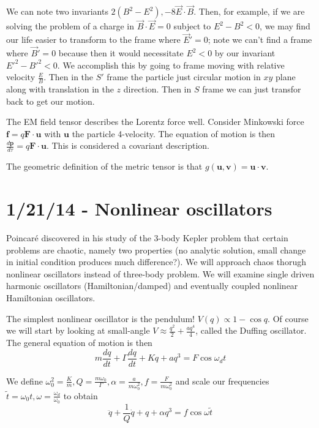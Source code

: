 \documentclass[10pt]{report}
\newcommand{\rd}[2]{\frac{d#1}{d#2}}
\begin{document}
We can note two invariants $2(B^2 - E^2), -8\vec{E}\cdot \vec{B}$. Then, for example, if we are solving the problem of a charge in $\vec{B}\cdot \vec{E} = 0$ subject to $E^2 - B^2 < 0$, we may find our life easier to transform to the frame where $\vec{E}' = 0$; note we can't find a frame where $\vec{B}' = 0$ because then it would necessitate $E^2 < 0$ by our invariant $E'^2 - B'^2 < 0$. We accomplish this by going to frame moving with relative velocity $\frac{E}{B}$. Then in the $S'$ frame the particle just circular motion in $xy$ plane along with translation in the $z$ direction. Then in $S$ frame we can just transfor back to get our motion. 

The EM field tensor describes the Lorentz force well. Consider Minkowski force $\mathbf{f} = q\mathbf{F}\cdot \mathbf{u}$ with $\mathbf{u}$ the particle 4-velocity. The equation of motion is then $\rd{\mathbf{p}}{\tau} = q\mathbf{F}\cdot \mathbf{u}$. This is considered a covariant description. 

The geometric definition of the metric tensor is that $g(\mathbf{u}, \mathbf{v}) = \mathbf{u}\cdot \mathbf{v}$.

\chapter{1/21/14 - Nonlinear oscillators}

Poincar\'e discovered in his study of the 3-body Kepler problem that certain problems are chaotic, namely two properties (no analytic solution, small change in initial condition produces much difference?). We will approach chaos thorugh nonlinear oscillators instead of three-body problem. We will examine single driven harmonic oscillators (Hamiltonian/damped) and eventually coupled nonlinear Hamiltonian oscillators.

The simplest nonlinear oscillator is the pendulum! $V(q) \propto 1-\cos q$. Of course we will start by looking at small-angle $V \approx \frac{q^2}{2} + \frac{aq^4}{4}$, called the Duffing oscillator. The general equation of motion is then
\begin{equation}
    m\rd{q}{t} + \Gamma\rd{q}{t} + Kq + aq^3 = F\cos \omega_d t
    \label{1.21.duffingComplex}
\end{equation}

We define $\omega_0^2 = \frac{K}{m}, Q = \frac{m\omega_0}{\Gamma}, \alpha = \frac{a}{m\omega_0^2}, f = \frac{F}{m\omega_0^2}$ and scale our frequencies $\tilde{t} = \omega_0 t, \omega = \frac{\omega_d}{\omega_0}$ to obtain
\begin{equation}
    \ddot{q} + \frac{1}{Q}\dot{q} + q + \alpha q^3 = f\cos \omega \tilde{t}
    \label{1.21.duffing}
\end{equation}
\end{document}
